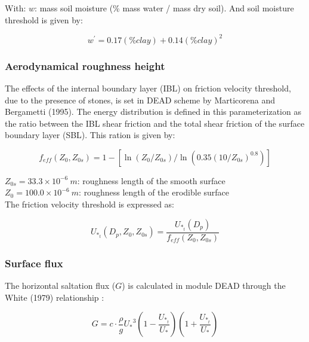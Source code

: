 With:
$w$: mass soil moisture (\% mass water / mass dry soil).
And soil moisture threshold is given by: 

\begin{equation}
w^{'} = 0.17 (\%clay) + 0.14 (\%clay)^{2}
\end{equation}


\subsubsection{Aerodynamical roughness height}

The effects of the internal boundary layer (IBL) on friction velocity threshold, due to the presence of stones,
is set in DEAD scheme by Marticorena and Bergametti (1995). The energy distribution is defined in this parameterization as the
ratio between the IBL shear friction and the total shear friction of the surface boundary layer (SBL). This ration is given by:

\begin{equation}
f_{eff}(Z_0,Z_{0s}) = 1 - \left [ \ln(Z_0/Z_{0s}) / \ln(0.35(10/Z_{0s})^{0.8}) \right ]
\end{equation}

	
$Z_{0s} = 33.3 \times 10^{-6}~m$: roughness length of the smooth surface \\
$Z_0 = 100.0 \times 10^{-6}~m$: roughness length of the erodible surface\\
The friction velocity threshold is expressed as:

\begin{equation}
U_{*_t}(D_p,Z_0,Z_{0s}) = \frac{U_{*_t}(D_p)}{f_{eff}(Z_0,Z_{0s})}
\end{equation}


\subsubsection{Surface flux}

The horizontal saltation flux ($G$) is calculated in module DEAD through the
White (1979)\nocite{White1979} relationship :

\begin{equation}
G = c \cdot \frac{\rho}{g}{U_*}^{3} \left ( 1-\frac{U_{*_t}}{U_{*}} \right ) \left (  1+\frac{U_{*_t}}{U_{*}} \right )
\end{equation}

